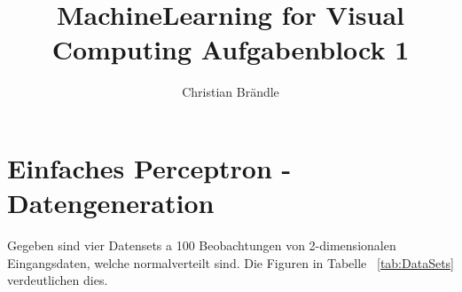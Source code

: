 \documentclass[]{report}
\title{MachineLearning for Visual Computing Aufgabenblock 1}
\author{Christian Br\"andle}
\begin{document}
\maketitle

\begin{abstract}
\end{abstract}

\section{Einfaches Perceptron - Datengeneration}


Gegeben sind vier Datensets a 100 Beobachtungen von 2-dimensionalen Eingangsdaten, welche normalverteilt sind. Die Figuren in Tabelle ~\ref{tab:DataSets} verdeutlichen dies.
\end{document}

